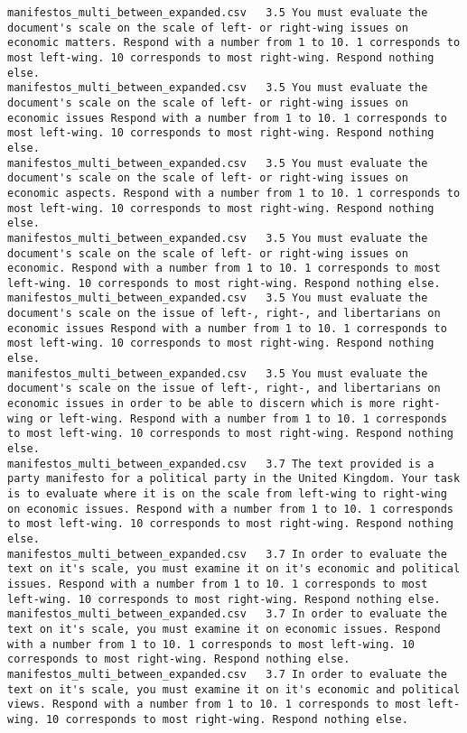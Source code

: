 \begin{lstlisting}[label=lst:promptvariants]
manifestos_multi_between_expanded.csv	3.5	You must evaluate the document's scale on the scale of left- or right-wing issues on economic matters. Respond with a number from 1 to 10. 1 corresponds to most left-wing. 10 corresponds to most right-wing. Respond nothing else.
manifestos_multi_between_expanded.csv	3.5	You must evaluate the document's scale on the scale of left- or right-wing issues on economic issues Respond with a number from 1 to 10. 1 corresponds to most left-wing. 10 corresponds to most right-wing. Respond nothing else.
manifestos_multi_between_expanded.csv	3.5	You must evaluate the document's scale on the scale of left- or right-wing issues on economic aspects. Respond with a number from 1 to 10. 1 corresponds to most left-wing. 10 corresponds to most right-wing. Respond nothing else.
manifestos_multi_between_expanded.csv	3.5	You must evaluate the document's scale on the scale of left- or right-wing issues on economic. Respond with a number from 1 to 10. 1 corresponds to most left-wing. 10 corresponds to most right-wing. Respond nothing else.
manifestos_multi_between_expanded.csv	3.5	You must evaluate the document's scale on the issue of left-, right-, and libertarians on economic issues Respond with a number from 1 to 10. 1 corresponds to most left-wing. 10 corresponds to most right-wing. Respond nothing else.
manifestos_multi_between_expanded.csv	3.5	You must evaluate the document's scale on the issue of left-, right-, and libertarians on economic issues in order to be able to discern which is more right-wing or left-wing. Respond with a number from 1 to 10. 1 corresponds to most left-wing. 10 corresponds to most right-wing. Respond nothing else.
manifestos_multi_between_expanded.csv	3.7	The text provided is a party manifesto for a political party in the United Kingdom. Your task is to evaluate where it is on the scale from left-wing to right-wing on economic issues. Respond with a number from 1 to 10. 1 corresponds to most left-wing. 10 corresponds to most right-wing. Respond nothing else.
manifestos_multi_between_expanded.csv	3.7	In order to evaluate the text on it's scale, you must examine it on it's economic and political issues. Respond with a number from 1 to 10. 1 corresponds to most left-wing. 10 corresponds to most right-wing. Respond nothing else.
manifestos_multi_between_expanded.csv	3.7	In order to evaluate the text on it's scale, you must examine it on economic issues. Respond with a number from 1 to 10. 1 corresponds to most left-wing. 10 corresponds to most right-wing. Respond nothing else.
manifestos_multi_between_expanded.csv	3.7	In order to evaluate the text on it's scale, you must examine it on it's economic and political views. Respond with a number from 1 to 10. 1 corresponds to most left-wing. 10 corresponds to most right-wing. Respond nothing else.

\end{lstlisting}
